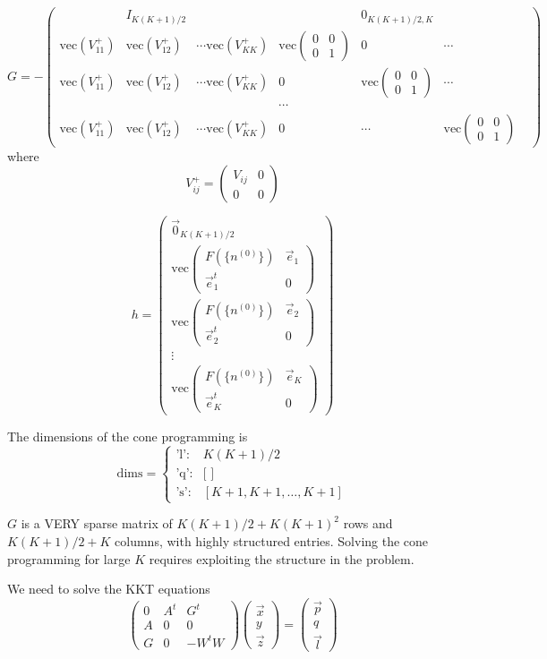 \documentclass{article}
\newcommand*{\mvec}{\mathbf{\mathrm{vec}}}
\newcommand*{\abcd}[4]{\left( \begin{array}{cc} #1 & #2 \\ #3 & #4 \end{array} \right)}
\begin{document}
\begin{equation}
G = - \left(
\begin{array}{ccccccc}
 & I_{K(K+1)/2} & & & 0_{K(K+1)/2, K} & \\
\mvec(V_{11}^+) & \mvec(V_{12}^+) & \cdots
\mvec(V_{KK}^+) & \mvec{\abcd{0}{0}{0}{1}} & 0 & \cdots \\
\mvec(V_{11}^+) & \mvec(V_{12}^+) & \cdots
\mvec(V_{KK}^+) & 0 & \mvec{\abcd{0}{0}{0}{1}} & \cdots \\
& & & \cdots & & & \\
\mvec(V_{11}^+) & \mvec(V_{12}^+) & \cdots
\mvec(V_{KK}^+) & 0 & \cdots & \mvec{\abcd{0}{0}{0}{1}}
\end{array}
\right)
\end{equation}
where
\begin{equation}
V_{ij}^{+} = \abcd{V_{ij}}{0}{0}{0}
\end{equation}

\begin{equation}
h = \left( 
\begin{array}{c}  
\vec{0}_{K(K+1)/2}  \\
  \mvec{\abcd{F(\{ n^{(0)} \})}{\vec{e}_1}{\vec{e}_1^t}{0}} \\
  \mvec{\abcd{F(\{ n^{(0)} \})}{\vec{e}_2}{\vec{e}_2^t}{0}} \\
  \vdots \\
  \mvec{\abcd{F(\{ n^{(0)} \})}{\vec{e}_K}{\vec{e}_K^t}{0}}
\end{array}
\right)
\end{equation}

The dimensions of the cone programming is
\begin{equation}
\mathrm{dims} = \left\{
\begin{array}{rl}
  \text{'l'}: & K(K+1)/2 \\
  \text{'q'}: & \text{[ ]} \\
  \text{'s'}: & [ K+1, K+1, \dots, K+1 ]
\end{array}
\right.
\end{equation}

$G$ is a VERY sparse matrix of $K(K+1)/2 + K(K+1)^2$ rows and
$K(K+1)/2 + K$ columns, with highly structured entries.  Solving the
cone programming for large $K$ requires exploiting the structure in
the problem.

We need to solve the KKT equations
\begin{equation}
\left(
\begin{array}{ccc}
0 & A^t & G^t \\
A & 0 & 0 \\
G & 0 & -W^t W 
\end{array} \right)
\left(
\begin{array}{c}
\vec{x} \\ y \\ \vec{z} 
\end{array} \right)
= \left(
\begin{array}{c}
\vec{p} \\ q \\ \vec{l}
\end{array} \right)
\end{equation}
\end{document}
